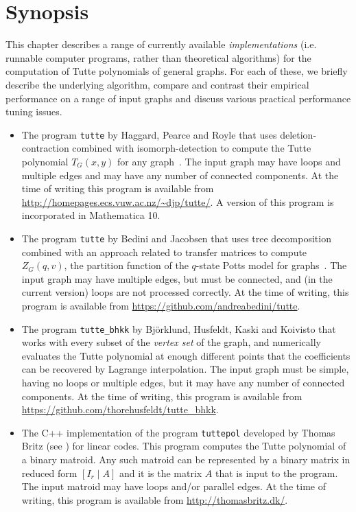 \section{Synopsis} This chapter describes a range of currently available {\em implementations} (i.e. runnable computer programs, rather than theoretical algorithms) for the computation of Tutte polynomials of general graphs. For each of these, we briefly describe the underlying algorithm, compare and contrast their empirical performance on a range of input graphs and discuss various practical performance tuning issues. 

\begin{itemize}
\item The program \verb+tutte+ by Haggard, Pearce and Royle that uses deletion-contraction combined with isomorph-detection to compute the Tutte polynomial $T_G(x,y)$ for any graph~\cite{HPR10,PHR09}. The input graph may have loops and multiple edges and may have any number of connected components.  At the time of writing this program is available from \url{http://homepages.ecs.vuw.ac.nz/~djp/tutte/}. A version of this program is incorporated in Mathematica 10.

\item The program \verb+tutte+ by Bedini and Jacobsen that uses tree decomposition combined with an approach related to transfer matrices to compute $Z_G(q,v)$, the partition function of the $q$-state Potts model for graphs~\cite{BJ10}. The input graph may have multiple edges, but must be connected, and (in the current version) loops are not processed correctly. At the time of writing, this program is available from \url{https://github.com/andreabedini/tutte}.

\item The program \verb+tutte_bhkk+ by Bj\"orklund, Husfeldt, Kaski and Koivisto \cite{BHKK08b} that works with every subset of the {\em vertex set} of the graph, and numerically evaluates the Tutte polynomial at enough different points that the coefficients can be recovered by Lagrange interpolation. The input graph must be simple, having no loops or multiple edges, but it may have any number of connected components. At the time of writing, this program is available from
\url{https://github.com/thorehusfeldt/tutte_bhkk}.

 \item The C++ implementation of the program \verb+tuttepol+ developed by Thomas Britz (see \cite{MR2319391}) for linear codes. This program computes the Tutte polynomial of a binary matroid. Any such matroid can be represented by a binary matrix in reduced form $[I_r \mid A]$ and it is the
 matrix $A$ that is input to the program. The input matroid may have loops and/or parallel edges. At the time of writing, this program is available from \url{http://thomasbritz.dk/}.
 

\end{itemize}
